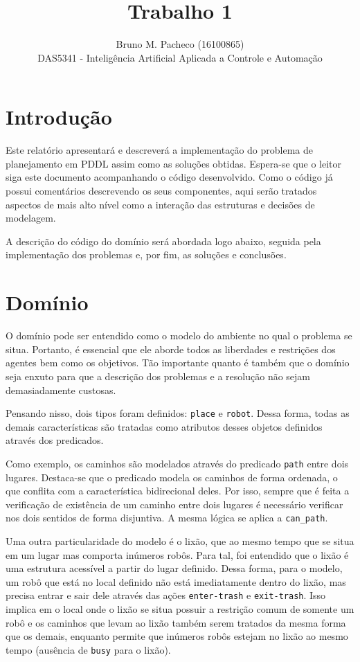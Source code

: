 \documentclass[a4paper]{report}
\begin{document}
 
\title{Trabalho 1}
\author{Bruno M. Pacheco (16100865)\\
DAS5341 - Inteligência Artificial Aplicada a Controle e Automação}
 
\maketitle
 
\section*{Introdução}

Este relatório apresentará e descreverá a implementação do problema de planejamento em PDDL assim como as soluções obtidas. Espera-se que o leitor siga este documento acompanhando o código desenvolvido. Como o código já possui comentários descrevendo os seus componentes, aqui serão tratados aspectos de mais alto nível como a interação das estruturas e decisões de modelagem.

A descrição do código do domínio será abordada logo abaixo, seguida pela implementação dos problemas e, por fim, as soluções e conclusões.

\section*{Domínio}

O domínio pode ser entendido como o modelo do ambiente no qual o problema se situa. Portanto, é essencial que ele aborde todos as liberdades e restrições dos agentes bem como os objetivos. Tão importante quanto é também que o domínio seja enxuto para que a descrição dos problemas e a resolução não sejam demasiadamente custosas.

Pensando nisso, dois tipos foram definidos: \texttt{place} e \texttt{robot}.
Dessa forma, todas as demais características são tratadas como atributos desses
objetos definidos através dos predicados.

Como exemplo, os caminhos são modelados através do predicado \texttt{path} entre dois lugares. Destaca-se que o predicado modela os caminhos de forma ordenada, o que conflita com a característica bidirecional deles. Por isso, sempre que é feita a verificação de existência de um caminho entre dois lugares é necessário verificar nos dois sentidos de forma disjuntiva. A mesma lógica se aplica a \texttt{can\_path}.

Uma outra particularidade do modelo é o lixão, que ao mesmo tempo que se situa em um lugar mas comporta inúmeros robôs. Para tal, foi entendido que o lixão é uma estrutura acessível a partir do lugar definido. Dessa forma, para o modelo, um robô que está no local definido não está imediatamente dentro do lixão, mas precisa entrar e sair dele através das ações \texttt{enter-trash} e \texttt{exit-trash}. Isso implica em o local onde o lixão se situa possuir a restrição comum de somente um robô e os caminhos que levam ao lixão também serem tratados da mesma forma que os demais, enquanto permite que inúmeros robôs estejam no lixão ao mesmo tempo (ausência de \texttt{busy} para o lixão).
\end{document}
